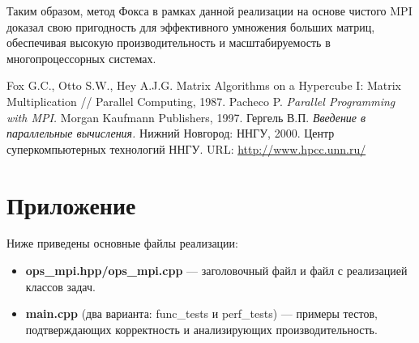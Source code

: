\documentclass{report}
\begin{document}
Таким образом, метод Фокса в рамках данной реализации на основе чистого MPI доказал свою пригодность для эффективного умножения больших матриц, обеспечивая высокую производительность и масштабируемость в многопроцессорных системах.

\newpage

\begin{thebibliography}{1}

 Fox G.C., Otto S.W., Hey A.J.G. Matrix Algorithms on a Hypercube I: Matrix Multiplication // Parallel Computing, 1987.
 Pacheco P. \textit{Parallel Programming with MPI.} Morgan Kaufmann Publishers, 1997.
 Гергель В.П. \textit{Введение в параллельные вычисления.} Нижний Новгород: ННГУ, 2000.
 Центр суперкомпьютерных технологий ННГУ. URL: \url{http://www.hpcc.unn.ru/}
\end{thebibliography}

\section*{Приложение}
Ниже приведены основные файлы реализации: 
\begin{itemize}
    \item \textbf{ops\_mpi.hpp/ops\_mpi.cpp} — заголовочный файл и файл с реализацией классов задач. 
    \item \textbf{main.cpp} (два варианта: func\_tests и perf\_tests) — примеры тестов, подтверждающих корректность и анализирующих производительность.
\end{itemize}
\end{document}

